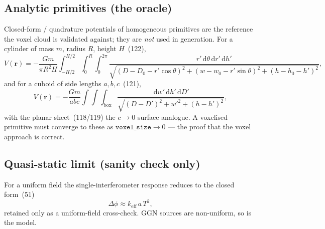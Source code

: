 \documentclass[11pt,a4paper]{article}
\theoremstyle{reqstyle}
\newcommand{\rv}{\mathbf{r}}
\newcommand{\dd}{\,\mathrm{d}}
\begin{document}
\subsection{Analytic primitives (the oracle)}
\label{sec:oracle}
Closed-form / quadrature potentials of homogeneous primitives are the reference the voxel
cloud is validated against; they are \emph{not} used in generation. For a cylinder of mass
$m$, radius $R$, height $H$~(122),
\begin{equation}
V(\rv) = -\frac{G m}{\pi R^2 H}
\int_{-H/2}^{H/2}\!\!\int_{0}^{R}\!\!\int_{0}^{2\pi}
\frac{r'\dd\theta\dd r'\dd h'}
{\sqrt{(D-D_0-r'\cos\theta)^2 + (w-w_0-r'\sin\theta)^2 + (h-h_0-h')^2}},
\end{equation}
and for a cuboid of side lengths $a,b,c$~(121),
\begin{equation}
V(\rv) = -\frac{G m}{abc}
\int\!\!\int\!\!\int_{\text{box}}
\frac{\dd w'\dd h'\dd D'}{\sqrt{(D-D')^2 + w'^2 + (h-h')^2}} ,
\end{equation}
with the planar sheet~(118/119) the $c\to 0$ surface analogue. A voxelised primitive must
converge to these as $\texttt{voxel\_size}\to 0$ --- the proof that the voxel approach is
correct.

\subsection{Quasi-static limit (sanity check only)}
For a uniform field the single-interferometer response reduces to the closed form~(51)
\begin{equation}
\Delta\phi \approx k_{\mathrm{eff}}\, a\, T^2 ,
\end{equation}
retained only as a uniform-field cross-check. GGN sources are non-uniform, so
 is the model.
\end{document}
